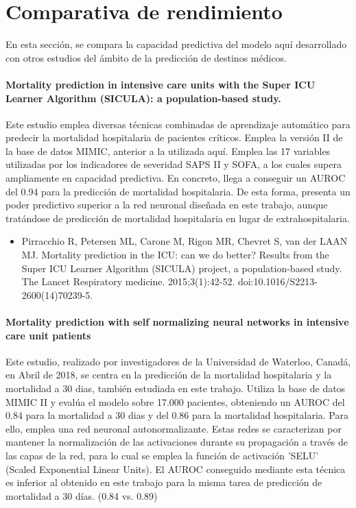 \documentclass{report}
\begin{document}
\section{Comparativa de rendimiento}

En esta sección, se compara la capacidad predictiva del modelo aquí desarrollado con otros estudios del ámbito de la predicción de destinos médicos.

\paragraph{Mortality prediction in intensive care units with the Super ICU Learner Algorithm (SICULA): a population-based study.} Este estudio emplea diversas técnicas combinadas de aprendizaje automático para predecir la mortalidad hospitalaria de pacientes críticos. Emplea la versión II de la base de datos MIMIC, anterior a la utilizada aquí. Emplea las 17 variables utilizadas por los indicadores de severidad SAPS II y SOFA, a los cuales supera ampliamente en capacidad predictiva. En concreto, llega a conseguir un AUROC del 0.94 para la predicción de mortalidad hospitalaria. 
De esta forma, presenta un poder predictivo superior a la red neuronal diseñada en este trabajo, aunque tratándose de predicción de mortalidad hospitalaria en lugar de extrahospitalaria.
\begin{itemize}
\item{Pirracchio R, Petersen ML, Carone M, Rigon MR, Chevret S, van der LAAN MJ. Mortality prediction in the ICU: can we do better? Results from the Super ICU Learner Algorithm (SICULA) project, a population-based study. The Lancet Respiratory medicine. 2015;3(1):42-52. doi:10.1016/S2213-2600(14)70239-5.}
\end{itemize}
\paragraph{Mortality prediction with self normalizing neural networks in intensive care unit patients} Este estudio, realizado por investigadores de la Universidad de Waterloo, Canadá, en Abril de 2018,  se centra en la predicción de la mortalidad hospitalaria y la mortalidad a 30 dias, también estudiada en este trabajo. Utiliza la base de datos MIMIC II y evalúa el modelo sobre 17.000 pacientes, obteniendo un AUROC del 0.84 para la mortalidad a 30 dias y del 0.86 para la mortalidad hospitalaria. Para ello, emplea una red neuronal autonormalizante. Estas redes se caracterizan por mantener la normalización de las activaciones durante su propagación a través de las capas de la red, para lo cual se emplea la función de activación 'SELU'  (Scaled Exponential Linear Units).
El AUROC conseguido mediante esta técnica es inferior al obtenido en este trabajo para la misma tarea de predicción de mortalidad a 30 días. (0.84 vs. 0.89)
\end{document}
